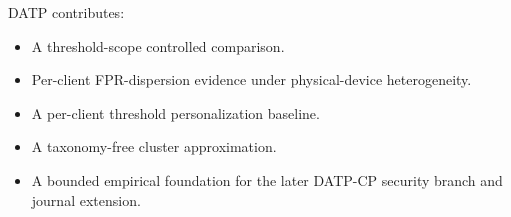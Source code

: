 \begin{tcolorbox}[callout]
DATP contributes:
\begin{itemize}
  \item A threshold-scope controlled comparison.
  \item Per-client FPR-dispersion evidence under physical-device heterogeneity.
  \item A per-client threshold personalization baseline.
  \item A taxonomy-free cluster approximation.
  \item A bounded empirical foundation for the later DATP-CP security branch and journal extension.
\end{itemize}
\end{tcolorbox}

